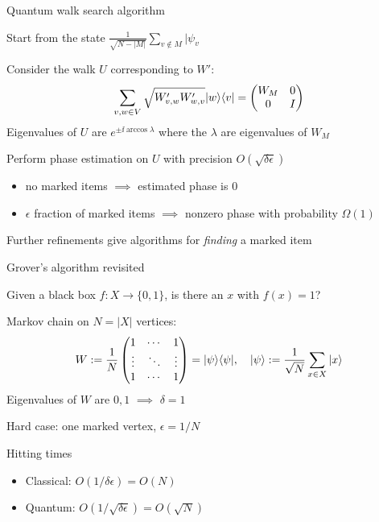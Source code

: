 
\begin{frame}{Quantum walk search algorithm}
  
Start from the state
$
  \frac{1}{\sqrt{N-|M|}} \sum_{v \not\in M} |\psi_v\>
$

\pause
\bigskip

Consider the walk $U$ corresponding to $W'$\pause{}:
\[
  \sum_{v,w \in V} \sqrt{W'_{v,w}W'_{w,v}}|w\rangle\langle v|
  = \begin{pmatrix}
  W_M & 0 \\ 0 & I
\end{pmatrix}
\] \pause
Eigenvalues of $U$ are $e^{\pm\ii\arccos\lambda}$ where the $\lambda$ are eigenvalues of $W_M$

\pause
\bigskip

Perform phase estimation on $U$ with precision $O(\sqrt{\delta\epsilon})$
\begin{itemize}
  \item<+-> no marked items $\implies$ estimated phase is $0$
  \item<+-> $\epsilon$ fraction of marked items $\implies$ nonzero phase with probability $\Omega(1)$
\end{itemize}

\bigskip

Further refinements give algorithms for \emph{finding} a marked item

\end{frame}


\begin{frame}{Grover's algorithm revisited}
  
\begin{problem}
Given a black box $f:X \to \{0,1\}$, is there an $x$ with $f(x)=1$?
\end{problem}

\pause
\bigskip

Markov chain on $N=|X|$ vertices:
\[
  W := \frac{1}{N} \begin{pmatrix}
  1 & \cdots & 1 \\
  \vdots & \ddots & \vdots \\
  1 & \cdots & 1
  \end{pmatrix}
  = |\psi\rangle\langle\psi|,
  \quad
  |\psi\rangle := \frac{1}{\sqrt N}\sum_{x \in X}|x\rangle
\] \pause
Eigenvalues of $W$ are $0,1$ $\implies$ $\delta = 1$

\pause
\bigskip

Hard case: one marked vertex, $\epsilon = 1/N$
\pause
\bigskip

Hitting times
\begin{itemize}
  \item<+-> Classical: $O(1/\delta\epsilon) = O(N)$
  \item<+-> Quantum: $O(1/\sqrt{\delta\epsilon}) = O(\sqrt{N})$
\end{itemize}

\end{frame}

